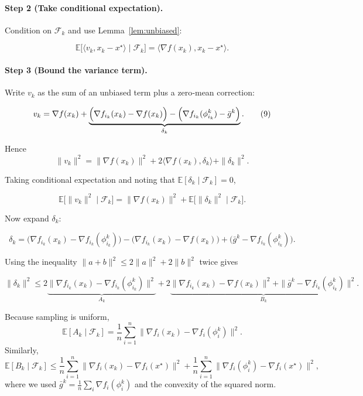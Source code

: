 \documentclass{article}
\newcommand{\E}{\mathbb{E}}
\begin{document}
\paragraph{Step 2 (Take conditional expectation).}
Condition on \(\mathcal{F}_k\) and use Lemma~\ref{lem:unbiased}:

\[
\E\!\bigl[\langle v_k, x_k-x^{\star}\rangle\mid\mathcal{F}_k\bigr]
   =\langle \nabla f(x_k),x_k-x^{\star}\rangle.          \tag{8}
\]

\paragraph{Step 3 (Bound the variance term).}
Write \(v_k\) as the sum of an unbiased term plus a zero‑mean correction:

\[
v_k = \nabla f(x_k) + \underbrace{\Bigl(\nabla f_{i_k}(x_k)-\nabla f(x_k)\Bigr)
          -\Bigl(\nabla f_{i_k}(\phi_{i_k}^{k})-\bar g^{k}\Bigr)}_{\delta_k}.
\tag{9}
\]

Hence
\[
\|v_k\|^{2}= \|\nabla f(x_k)\|^{2}+2\langle\nabla f(x_k),\delta_k\rangle+\|\delta_k\|^{2}.
\tag{10}
\]

Taking conditional expectation and noting that \(\E[\delta_k\mid\mathcal{F}_k]=0\),

\[
\E\!\bigl[\|v_k\|^{2}\mid\mathcal{F}_k\bigr]
   =\|\nabla f(x_k)\|^{2}+\E\!\bigl[\|\delta_k\|^{2}\mid\mathcal{F}_k\bigr].
\tag{11}
\]

Now expand \(\delta_k\):

\[
\delta_k=\bigl(\nabla f_{i_k}(x_k)-\nabla f_{i_k}(\phi_{i_k}^{k})\bigr)
        -\bigl(\nabla f_{i_k}(x_k)-\nabla f(x_k)\bigr)
        +\bigl(\bar g^{k}-\nabla f_{i_k}(\phi_{i_k}^{k})\bigr).
\tag{12}
\]

Using the inequality \(\|a+b\|^{2}\le 2\|a\|^{2}+2\|b\|^{2}\) twice gives

\[
\|\delta_k\|^{2}\le 2\underbrace{\|\nabla f_{i_k}(x_k)-\nabla f_{i_k}(\phi_{i_k}^{k})\|^{2}}_{A_k}
               +2\underbrace{\|\nabla f_{i_k}(x_k)-\nabla f(x_k)\|^{2}
                              +\|\bar g^{k}-\nabla f_{i_k}(\phi_{i_k}^{k})\|^{2}}_{B_k}.
\tag{13}
\]

Because sampling is uniform,
\[
\E[A_k\mid\mathcal{F}_k]=\frac{1}{n}\sum_{i=1}^{n}\|\nabla f_i(x_k)-\nabla f_i(\phi_i^{k})\|^{2}.
\tag{14}
\]
Similarly,
\[
\E[B_k\mid\mathcal{F}_k]\le
\frac{1}{n}\sum_{i=1}^{n}\|\nabla f_i(x_k)-\nabla f_i(x^{\star})\|^{2}
+\frac{1}{n}\sum_{i=1}^{n}\|\nabla f_i(\phi_i^{k})-\nabla f_i(x^{\star})\|^{2},
\tag{15}
\]
where we used \(\bar g^{k}=\frac{1}{n}\sum_i\nabla f_i(\phi_i^{k})\) and the convexity of the squared norm.
\end{document}
